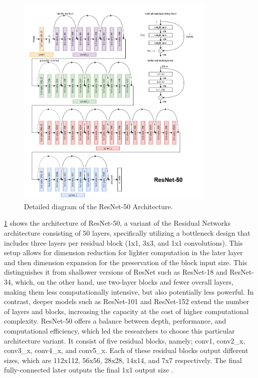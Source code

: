 \begin{refsection}
\begin{figure}[H]
    \centering
	\includegraphics[width=0.85\textwidth]{figures/resnet.png} 
	\caption[ResNet-50 Architecture]{Detailed diagram of the ResNet-50 Architecture.}
	\label{fig:firstFig}
\end{figure}

\ref{fig:firstFig} shows the architecture of ResNet-50, a variant of the Residual Networks architecture consisting of 50 layers, specifically utilizing a bottleneck design that includes three layers per residual block (1x1, 3x3, and 1x1 convolutions). This setup allows for dimension reduction for lighter computation in the later layer and then dimension expansion for the preservation of the block input size. This distinguishes it from shallower versions of ResNet such as ResNet-18 and ResNet-34, which, on the other hand, use two-layer blocks and fewer overall layers, making them less computationally intensive, but also potentially less powerful. In contrast, deeper models such as ResNet-101 and ResNet-152 extend the number of layers and blocks, increasing the capacity at the cost of higher computational complexity. ResNet-50 offers a balance between depth, performance, and computational efficiency, which led the researchers to choose this particular architecture variant. It consist of five residual blocks, namely; conv1, conv2\_x, conv3\_x, conv4\_x, and conv5\_x. Each of these residual blocks output different sizes, which are 112x112, 56x56, 28x28, 14x14, and 7x7 respectively. The final fully-connected later outputs the final 1x1 output size \cite{he2015deepresiduallearningimage}.


\end{refsection}

